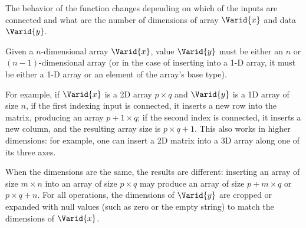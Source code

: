 The behavior of the function changes depending on which of the inputs are
connected and what are the number of dimensions of array \ensuremath{\Varid{x}} and data \ensuremath{\Varid{y}}.

Given a $n$-dimensional array \ensuremath{\Varid{x}}, value \ensuremath{\Varid{y}} must be either an $n$ or
$(n-1)$-dimensional array (or in the case of inserting into a 1-D array, it
must be either a 1-D array or an element of the array's base type).

For example, if \ensuremath{\Varid{x}} is a 2D array $p \times q$ and \ensuremath{\Varid{y}} is a 1D array of size
$n$, if the first indexing input is connected, it inserts a new row into the
matrix, producing an array $p+1 \times q$; if the second index is connected,
it inserts a new column, and the resulting array size is $p \times q+1$. This
also works in higher dimensions: for example, one can insert a 2D matrix into
a 3D array along one of its three axes.

When the dimensions are the same, the results are different: inserting an
array of size $m \times n$ into an array of size $p \times q$ may produce an
array of size $p+m \times q$ or $p \times q+n$. For all operations, the
dimensions of \ensuremath{\Varid{y}} are cropped or expanded with null values (such as zero or
the empty string) to match the dimensions of \ensuremath{\Varid{x}}.

